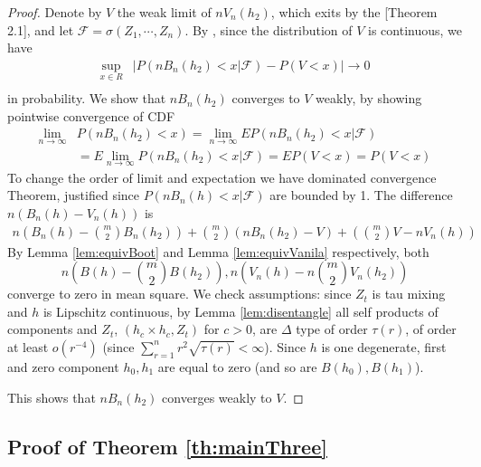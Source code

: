 \documentclass{article} %
\newcommand{\ev}{E}
\begin{document}
\begin{proof}
Denote by $V$ the weak limit of $n V_n(h_2)$, which exits by the  \cite{leucht_dependent_2013}[Theorem 2.1],  and let $\mathcal{F} = \sigma(Z_1, \cdots , Z_n)$.   By \cite[Theorem 3.1]{leucht_dependent_2013}, since the distribution of  $V$ is continuous, we have 
\begin{align*}
\sup_{x \in R} &\left| P(nB_n(h_2)  < x|\mathcal{F}) -   P(V<x) \right| \to 0  \\
\end{align*}
in probability. We show that $nB_n(h_2)$ converges  to $V$ weakly, by showing  pointwise convergence  of CDF  
\begin{align*}
 \lim_{n \to \infty} &P(nB_n(h_2)  < x) =  \lim_{n \to \infty} \ev P(nB_n(h_2)  < x|\mathcal{F}) \\
 &=  \ev  \lim_{n \to \infty} P(nB_n(h_2)  < x|\mathcal{F})  = \ev P(V<x) =P(V<x) 
\end{align*}
To change the order of limit and expectation we have dominated convergence Theorem, justified since  $P(nB_n(h)  < x|\mathcal{F})$  are bounded by 1.
The difference $n(B_n(h) - V_n(h))$ is
\begin{align*}
 n \left (B_n(h) -  \binom m 2 B_n(h_2) \right) + \binom m 2 \left (n B_n(h_2) -V\right)+ \left (\binom m 2 V - nV_n(h)\right)
 \end{align*}
By  Lemma \ref{lem:equivBoot} and Lemma \ref{lem:equivVanila} respectively, both 
$$n (B(h) -   \binom m 2  B(h_2)) , n (V_n(h) - n \binom m 2 V_n(h_2))$$
converge to zero in mean square. We check assumptions: since $Z_t$ is tau mixing and $h$ is Lipschitz continuous, by Lemma \ref{lem:disentangle} all self products of components and $Z_t$, $(h_c \times h_c,Z_t)$ for $c>0$, are $\varDelta$ type of order $\tau(r)$, of order at least  $o(r^{-4})$ (since $\sum_{r=1}^n r^2 \sqrt{\tau(r)} < \infty$). Since $h$ is one degenerate,  first and zero component $h_0,h_1$ are equal to zero (and so are $B(h_0),B(h_1)$).  

This shows that $nB_n(h_2)$ converges weakly to $V$. 
\end{proof}  

\subsection{Proof of Theorem \ref{th:mainThree}}
\end{document}
